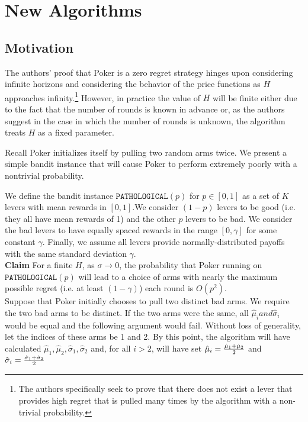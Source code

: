 \documentclass[12pt]{article}
\begin{document}
\section{New Algorithms}

\subsection{Motivation}

The authors' proof that Poker is a zero regret strategy hinges upon considering infinite horizons and considering the behavior of the price functions as $H$ approaches infinity.\footnote{The authors specifically seek to prove that there does not exist a lever that provides high regret that is pulled many times by the algorithm with a non-trivial probability.} However, in practice the value of $H$ will be finite either due to the fact that the number of rounds is known in advance or, as the authors suggest in the case in which the number of rounds is unknown, the algorithm treats $H$ as a fixed parameter.

Recall Poker initializes itself by pulling two random arms twice. We present a simple bandit instance that will cause Poker to perform extremely poorly with a nontrivial probability.

We define the bandit instance $\texttt{PATHOLOGICAL}(p)$ for $p \in [0,1]$ as a set of $K$ levers with mean rewards in $[0,1]$.We consider $(1-p)$ levers to be good (i.e. they all have mean rewards of 1) and the other $p$ levers to be bad. We consider the bad levers to have equally spaced rewards in the range $[0,\gamma]$ for some constant $\gamma$. Finally, we assume all levers provide normally-distributed payoffs with the same standard deviation $\gamma$. \\

\noindent
\textbf{Claim} For a finite $H$, as $\sigma \rightarrow 0$, the probability that Poker running on $\texttt{PATHOLOGICAL}(p)$ will lead to a choice of arms with nearly the maximum possible regret (i.e. at least $(1-\gamma)$) each round is $O(p^{2})$. \\ 

Suppose that Poker initially chooses to pull two distinct bad arms. We require the two bad arms to be distinct. If the two arms were the same, all $\hat{\mu}_{i} and \hat{\sigma}_{i}$ would be equal and the following argument would fail. Without loss of generality, let the indices of these arms be 1 and 2. By this point, the algorithm will have calculated $\hat{\mu}_{1}, \hat{\mu}_{2}, \hat{\sigma}_{1},\hat{\sigma}_{2}$ and, for all $i > 2$, will have set $\hat{\mu}_{i}= {\hat{\mu}_{1}+\hat{\mu}_{2}\over 2}$ and $\hat{\sigma}_{i} = {\hat{\sigma}_{1}+\hat{\sigma}_{2}\over 2}$
\end{document}
